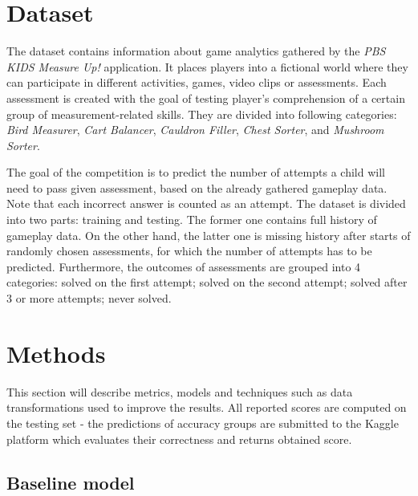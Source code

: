 \documentclass[fleqn,10pt]{SelfArx} %
\begin{document}

\section{Dataset}

The dataset contains information about game analytics gathered by the \textit{PBS KIDS Measure Up!} application.
It places players into a fictional world where they can participate in different activities, games, video clips or assessments.
Each assessment is created with the goal of testing player's comprehension of a certain group of measurement-related skills.
They are divided into following categories: \textit{Bird Measurer}, \textit{Cart Balancer}, \textit{Cauldron Filler}, \textit{Chest Sorter}, and \textit{Mushroom Sorter}.

The goal of the competition is to predict the number of attempts a child will need to pass given assessment, based on the already gathered gameplay data.
Note that each incorrect answer is counted as an attempt.
The dataset is divided into two parts: training and testing.
The former one contains full history of gameplay data.
On the other hand, the latter one is missing history after starts of randomly chosen assessments, for which the number of attempts has to be predicted.
Furthermore, the outcomes of assessments are grouped into 4 categories: solved on the first attempt; solved on the second attempt; solved after 3 or more attempts; never solved.



\section{Methods}

This section will describe metrics, models and techniques such as data transformations used to improve the results.
All reported scores are computed on the testing set - the predictions of accuracy groups are submitted to the Kaggle platform which evaluates their correctness and returns obtained score.

\subsection{Baseline model}
\end{document}
